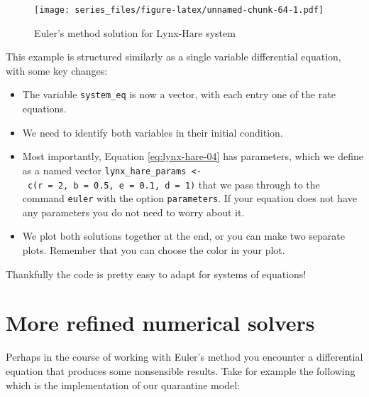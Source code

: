 \documentclass[
]{book}
\providecommand{\tightlist}{%
  \setlength{\itemsep}{0pt}\setlength{\parskip}{0pt}}
\theoremstyle{definition}
\theoremstyle{definition}
\theoremstyle{definition}
\theoremstyle{remark}
\begin{document}
\begin{figure}
\centering
\texttt{[image: series\_files/figure-latex/unnamed-chunk-64-1.pdf]}
\caption{\label{fig:unnamed-chunk-64}Euler's method solution for Lynx-Hare system}
\end{figure}

This example is structured similarly as a single variable differential equation, with some key changes:

\begin{itemize}
\tightlist
\item
  The variable \texttt{system\_eq} is now a vector, with each entry one of the rate equations.
\item
  We need to identify both variables in their initial condition.
\item
  Most importantly, Equation \eqref{eq:lynx-hare-04} has parameters, which we define as a named vector \texttt{lynx\_hare\_params\ \textless{}-\ c(r\ =\ 2,\ b\ =\ 0.5,\ e\ =\ 0.1,\ d\ =\ 1)} that we pass through to the command \texttt{euler} with the option \texttt{parameters}. If your equation does not have any parameters you do not need to worry about it.
\item
  We plot both solutions together at the end, or you can make two separate plots. Remember that you can choose the color in your plot.
\end{itemize}

Thankfully the code is pretty easy to adapt for systems of equations!

\hypertarget{more-refined-numerical-solvers}{%
\section{More refined numerical solvers}\label{more-refined-numerical-solvers}}

Perhaps in the course of working with Euler's method you encounter a differential equation that produces some nonsensible results. Take for example the following which is the implementation of our quarantine model:
\end{document}
